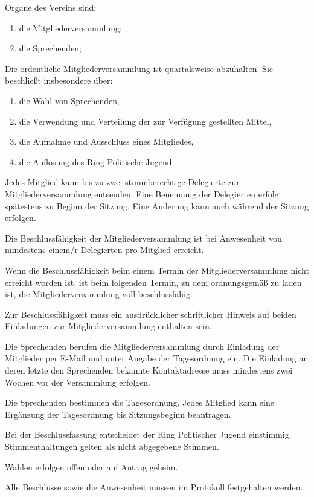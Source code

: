 \documentclass[10pt,a4paper,oneside,parskip=half]{scrartcl}
\begin{document}
\begin{contract}
Organe des Vereins sind:
\begin{enumerate}
\item die Mitgliederversammlung;
\item die Sprechenden;
\end{enumerate}

Die ordentliche Mitgliederversammlung ist quartalsweise abzuhalten. Sie beschließt insbesondere über:
\begin{enumerate}
\item die Wahl von Sprechenden,
\item die Verwendung und Verteilung der zur Verfügung gestellten Mittel,
\item die Aufnahme und Ausschluss eines Mitgliedes,
\item die Auflösung des Ring Politische Jugend.
\end{enumerate}

Jedes Mitglied kann bis zu zwei stimmberechtige Delegierte zur Mitgliederversammlung entsenden. Eine Benennung der Delegierten erfolgt spätestens zu Beginn der Sitzung. Eine Änderung kann auch während der Sitzung erfolgen.

Die Beschlussfähigkeit der Mitgliederversammlung ist bei Anwesenheit von mindestens einem/r Delegierten pro Mitglied erreicht.

Wenn die Beschlussfähigkeit beim einem Termin der Mitgliederversammlung nicht erreicht worden ist, ist beim folgenden Termin, zu dem ordnungsgemäß zu laden ist, die Mitgliederversammlung voll beschlussfähig.

Zur Beschlussfähigkeit muss ein ausdrücklicher schriftlicher Hinweis auf beiden Einladungen zur Mitgliederversammlung enthalten sein.

Die Sprechenden berufen die Mitgliederversammlung durch Einladung der Mitglieder per E-Mail und unter Angabe der Tagesordnung ein. Die Einladung an deren letzte den Sprechenden bekannte Kontaktadresse muss mindestens zwei Wochen vor der Versammlung erfolgen.

Die Sprechenden bestimmen die Tagesordnung. Jedes Mitglied kann eine Ergänzung der Tagesordnung bis Sitzungsbeginn beantragen.

Bei der Beschlussfassung entscheidet der Ring Politischer Jugend einstimmig. Stimmenthaltungen gelten als nicht abgegebene Stimmen.

Wahlen erfolgen offen oder auf Antrag geheim.

Alle Beschlüsse sowie die Anwesenheit müssen im Protokoll festgehalten werden.


\end{contract}
\end{document}
